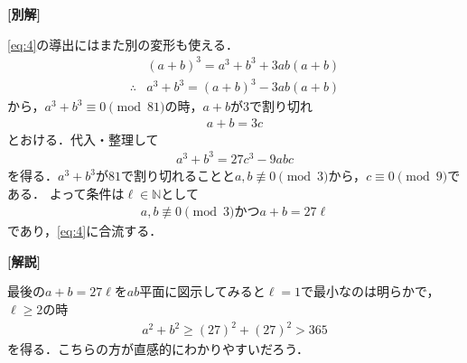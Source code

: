 \documentclass[../../main.tex]{subfiles}
\begin{document}
{\bf [別解]}

\cref{eq:4}の導出にはまた別の変形も使える．
\begin{align}
  & (a+b)^3=a^3+b^3+3ab(a+b) \\
  \therefore
  & a^3+b^3 = (a+b)^3 - 3ab(a+b)
\end{align}
から，$a^3+b^3\equiv0\pmod{81}$の時，$a+b$が$3$で割り切れ
\begin{align}
  a+b=3c
\end{align}
とおける．代入・整理して
\begin{align}
  a^3+b^3 = 27c^3 - 9abc
\end{align}
を得る．$a^3+b^3$が$81$で割り切れることと$a,b\not\equiv0\pmod3$から，$c\equiv0\pmod9$である．
よって条件は$\ell\in\mathbb{N}$として
\begin{align}
  a,b\not\equiv0\pmod3\text{かつ}a+b=27\ell
\end{align}
であり，\cref{eq:4}に合流する．

{\bf [解説]}

最後の$a+b=27\ell$を$ab$平面に図示してみると$\ell=1$で最小なのは明らかで，$\ell\ge2$の時
\begin{align}
  a^2+b^2\ge(27)^2+(27)^2>365
\end{align}
を得る．こちらの方が直感的にわかりやすいだろう．
\end{document}
